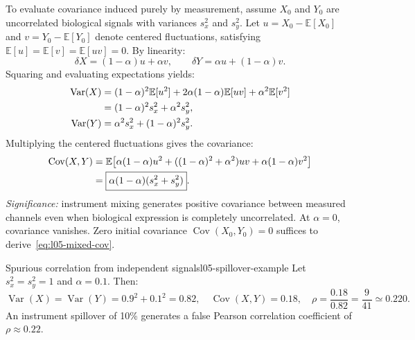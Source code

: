 To evaluate covariance induced purely by measurement, assume $X_0$ and $Y_0$ are uncorrelated biological signals with variances $s_x^2$ and $s_y^2$. Let $u=X_0-\mathbb E[X_0]$ and $v=Y_0-\mathbb E[Y_0]$ denote centered fluctuations, satisfying $\mathbb E[u]=\mathbb E[v]=\mathbb E[uv]=0$. By linearity:
\begin{equation}
\delta X=(1-\alpha)u+\alpha v,\qquad
\delta Y=\alpha u+(1-\alpha)v.
\label{eq:l05-centered-mixing}
\end{equation}
Squaring and evaluating expectations yields:
\begin{align}
\operatorname{Var}(X)
&=(1-\alpha)^2\mathbb E[u^2]
+2\alpha(1-\alpha)\mathbb E[uv]+\alpha^2\mathbb E[v^2] \notag\\
&=(1-\alpha)^2s_x^2+\alpha^2s_y^2,\label{eq:l05-mixed-varx}\\
\operatorname{Var}(Y)&=\alpha^2s_x^2+(1-\alpha)^2s_y^2.
\label{eq:l05-mixed-vary}
\end{align}
Multiplying the centered fluctuations gives the covariance:
\begin{align}
\operatorname{Cov}(X,Y)
&=\mathbb E\big[\alpha(1-\alpha)u^2
+((1-\alpha)^2+\alpha^2)uv+\alpha(1-\alpha)v^2\big] \notag\\
&=\boxed{\alpha(1-\alpha)(s_x^2+s_y^2)}.
\label{eq:l05-mixed-cov}
\end{align}
\textit{Significance:} instrument mixing generates positive covariance between measured channels even when biological expression is completely uncorrelated. At $\alpha=0$, covariance vanishes. Zero initial covariance $\operatorname{Cov}(X_0, Y_0)=0$ suffices to derive~\eqref{eq:l05-mixed-cov}.

\begin{example}{Spurious correlation from independent signals}{l05-spillover-example}
Let $s_x^2=s_y^2=1$ and $\alpha=0.1$. Then:
\begin{equation}
\operatorname{Var}(X)=\operatorname{Var}(Y)=0.9^2+0.1^2=0.82,
\quad\operatorname{Cov}(X,Y)=0.18,
\quad\rho=\frac{0.18}{0.82}=\frac9{41}\simeq0.220.
\label{eq:l05-spillover-numbers}
\end{equation}
An instrument spillover of 10\% generates a false Pearson correlation coefficient of $\rho \approx 0.22$.
\end{example}

